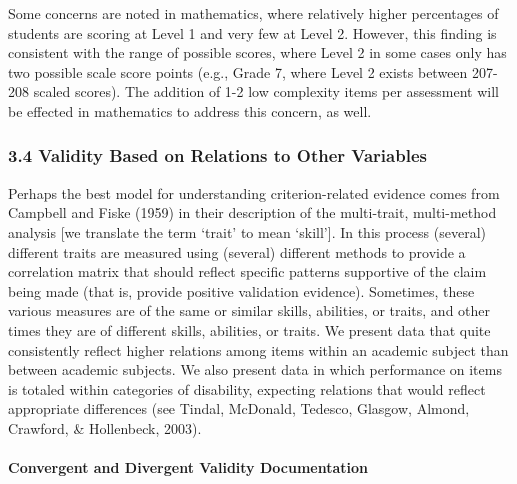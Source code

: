 \documentclass[]{article}
\newenvironment{Shaded}{\begin{snugshade}}{\end{snugshade}}
\newcommand{\KeywordTok}[1]{\textcolor[rgb]{0.13,0.29,0.53}{\textbf{#1}}}
\newcommand{\NormalTok}[1]{#1}
\newcommand{\OperatorTok}[1]{\textcolor[rgb]{0.81,0.36,0.00}{\textbf{#1}}}
\let\oldparagraph\paragraph
\renewcommand{\paragraph}[1]{\oldparagraph{#1}\mbox{}}
\begin{document}
\clearpage

\begin{Shaded}
\end{Shaded}

Some concerns are noted in mathematics, where relatively higher
percentages of students are scoring at Level 1 and very few at Level 2.
However, this finding is consistent with the range of possible scores,
where Level 2 in some cases only has two possible scale score points
(e.g., Grade 7, where Level 2 exists between 207-208 scaled scores). The
addition of 1-2 low complexity items per assessment will be effected in
mathematics to address this concern, as well.

\hypertarget{validity-based-on-relations-to-other-variables}{%
\subsubsection{3.4 Validity Based on Relations to Other
Variables}\label{validity-based-on-relations-to-other-variables}}

Perhaps the best model for understanding criterion-related evidence
comes from Campbell and Fiske (1959) in their description of the
multi-trait, multi-method analysis {[}we translate the term `trait' to
mean `skill'{]}. In this process (several) different traits are measured
using (several) different methods to provide a correlation matrix that
should reflect specific patterns supportive of the claim being made
(that is, provide positive validation evidence). Sometimes, these
various measures are of the same or similar skills, abilities, or
traits, and other times they are of different skills, abilities, or
traits. We present data that quite consistently reflect higher relations
among items within an academic subject than between academic subjects.
We also present data in which performance on items is totaled within
categories of disability, expecting relations that would reflect
appropriate differences (see Tindal, McDonald, Tedesco, Glasgow, Almond,
Crawford, \& Hollenbeck, 2003).

\hypertarget{convergent-and-divergent-validity-documentation}{%
\paragraph{Convergent and Divergent Validity
Documentation}\label{convergent-and-divergent-validity-documentation}}
\end{document}
